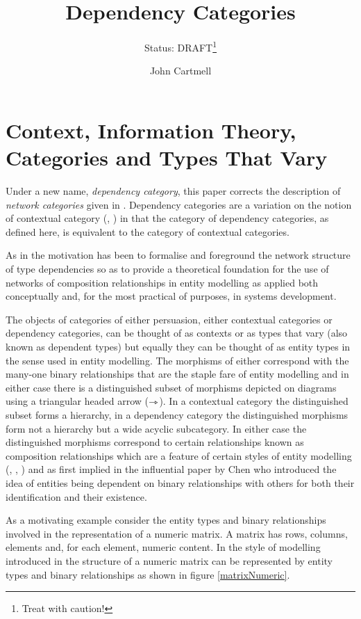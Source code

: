 \documentclass[10pt,a4paper]{scrartcl}
\title{Dependency Categories}
\author{John Cartmell}
\subtitle{Status: DRAFT\footnote{Treat with caution!}}
\begin{document}
\maketitle

\section{Context, Information Theory, Categories and Types That Vary}

\noindent Under a new name, \textit{dependency category}, this paper corrects the description of \textit{network categories} given in  
\cite{Cartmell86B}. Dependency categories are a variation on the notion of contextual category (\cite{Cartmell78}, \cite{Cartmell86}) in that  the category of dependency categories, as defined here, is equivalent to the category of contextual categories.

As in \cite{Cartmell86B} the motivation has been to formalise
and foreground the network structure of type dependencies so as to provide a theoretical foundation for the use of networks of composition relationships in entity modelling as applied both conceptually and, for the most practical of purposes, in systems development. 

The objects of  categories of either persuasion, either contextual categories or dependency categories, can be thought 
of as contexts or as types that vary (also known as dependent types) but equally they can be thought of as entity 
types in the sense used in entity modelling. The
morphisms of either correspond with the many-one binary relationships that are the staple fare of entity modelling and in either case there is a  distinguished subset of morphisms depicted on diagrams using a triangular headed arrow ($\rightarrowtriangle$). In a contextual category  the distinguished 
subset forms a hierarchy, in a dependency category the distinguished morphisms form not a hierarchy but a wide acyclic subcategory.
In either case the distinguished morphisms correspond to certain relationships known as composition relationships which are a feature
of certain styles of entity modelling (\cite{ECMA-149}, \cite{Munck1988}, \cite{entitymodelling}) and as first implied in the influential paper by Chen \cite{Chen1976} who introduced the idea of entities being dependent on binary relationships 
with others for both their identification and their existence.

As a motivating example consider the entity types and binary relationships involved in the representation of a numeric matrix. 
A matrix has rows, columns, elements and, for each element, numeric content. In the style of modelling introduced in \cite{entitymodelling} the structure of a numeric matrix can be represented by entity types and binary relationships as shown in figure \ref{matrixNumeric}.
\end{document}
